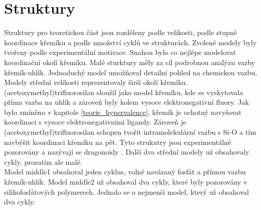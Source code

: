 \documentclass[
  digital, %
  table,   %
  lof,     %
  lot,     %
  oneside,
]{fithesis3}
\begin{document}
\section{Struktury}
Struktury pro teoretickou část jsou rozděleny podle velikosti, podle stupně koordinace křemíku a podle množství cyklů ve strukturách. Zvolené modely byly tvořeny podle experimentální motivace. Snahou bylo co nejlépe modelovat koordinační okolí křemíku. Malé sturktury měly za cíl podrobnou analýzu vazby křemík-uhlík. Jednoduchý model umožňoval detailní pohled na chemickou vazbu.\\

Modely střední velikosti reprezentovaly širší okolí křemíku. (acetoxymethyl)trifluorosilan sloužil jako model křemíku, kde se vyskytovala příma vazba na uhlík a zároveň byly kolem vysoce elektronegativní fluory. Jak bylo zmíněno v kapitole \ref{teorie_hypervalence}, křemík je ochotný navyšovat koordinaci s vysoce elektronegativními ligandy. Zároveň je (acetoxymethyl)trifluorosilan schopen tvořit intramolekulární vazbu s Si-O a tím navbýšit koordinaci křemíku na pět. Tyto strukutry jsou experimentálně pozorovány a nazývají se dragonoidy \cite{Chipanina2011}. Další dva střední modely už obsahovaly cykly, prozatím ale malé. \\
Model middle1  obsahoval jeden cyklus, volně navázaný fosfát a přímou vazbu křemík-uhlík. Model middle2  už obsahoval dva cykly, které byly pozorovány v silikofosfátových polymerech. Jednalo se o nejmenší model, který už obsahoval dva cykly.\\
\end{document}
